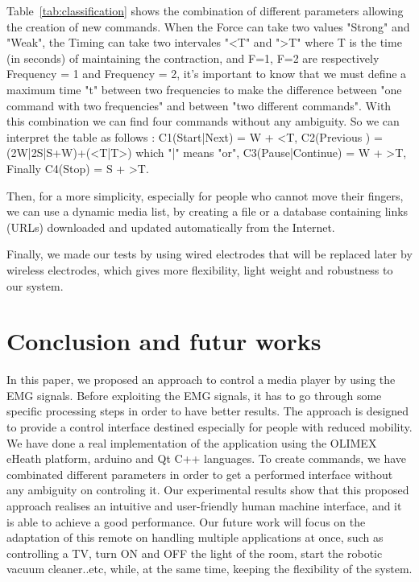 \documentclass[conference]{IEEEtran}
\begin{document}
Table~\ref{tab:classification} shows the combination of different parameters allowing the creation of new commands. When the Force can take two values "Strong" and "Weak", the Timing can take two intervales "<T" and ">T" where T is the time (in seconds) of maintaining the contraction, and F=1, F=2 are respectively Frequency = 1 and Frequency = 2, it's important to know that we must define a maximum time "t" between two frequencies to make the difference between "one command with two frequencies" and between "two different commands". With this combination we can find four commands without any ambiguity. So we can interpret the table as follows : C1(Start|Next) =  W + <T, C2(Previous
) = (2W|2S|S+W)+(<T|T>) which "|" means "or", C3(Pause|Continue) = W + >T, Finally C4(Stop) = S + >T.\par
Then, for a more simplicity, especially for people who cannot move their fingers, we can use a dynamic media list, by creating a file or a database containing links (URLs) downloaded and updated automatically from the Internet.\par
Finally, we made our tests by using wired electrodes that will be replaced later by wireless electrodes, which gives more flexibility, light weight and robustness to our system.\par

\section{Conclusion and futur works} \label{sec:conclusion}
In this paper, we proposed an approach to control a media player by using the EMG signals. Before exploiting the EMG signals, it has to go through some specific processing steps in order to have better results. The approach is designed to provide a control interface destined especially for people with reduced mobility. We have done a real implementation of the application using the OLIMEX eHeath platform, arduino and Qt C++ languages.
To create commands, we have combinated different parameters in order to get a performed interface without any ambiguity on controling it. Our experimental results show that this proposed approach realises an intuitive and user-friendly human machine interface, and it is able to achieve a good performance.
Our future work will focus on the adaptation of this remote on handling multiple applications at once, such as controlling a TV, turn ON and OFF the light of the room, start the robotic vacuum cleaner..etc, while, at the same time,  keeping the flexibility of the system.
\end{document}
